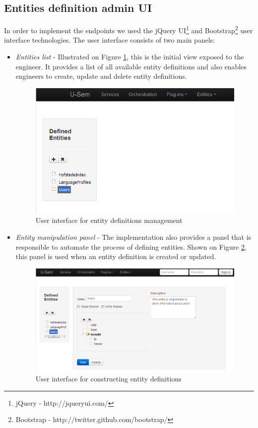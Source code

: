 \subsection{Entities definition admin UI}
In order to implement the endpoints we used the jQuery UI\footnote{jQuery - http://jqueryui.com/} and Bootstrap\footnote{Bootstrap - http://twitter.github.com/bootstrap/} user interface technologies. The user interface consists of two main panels:
	\begin{itemize}
	
		\item \textit{Entities list} - Illustrated on Figure \ref{fig:storageEntityList}, this is the initial view exposed to the engineer. It provides a list of all available entity definitions and also enables engineers to create, update and delete entity definitions.
		
\begin{figure}[h!]
  \centering
  	\includegraphics[scale=0.5]{storage/ui/entityList.png}
  \caption{User interface for entity definitions management}
  \label{fig:storageEntityList}
\end{figure}
		
		\item \textit{Entity manipulation panel} - The implementation also provides a panel that is responsible to automate the process of defining entities. Shown on Figure \ref{fig:storageEntityPanel}, this panel is used when an entity definition is created or updated.
		
\begin{figure}[h!]
  \centering
  	\includegraphics[scale=0.5]{storage/ui/entityPanel.png}
  \caption{User interface for constructing entity definitions}
  \label{fig:storageEntityPanel}
\end{figure}


\end{itemize}
